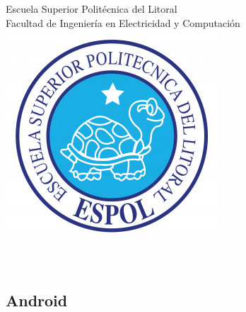 \documentclass[10pt]{article}
\begin{document}
{\centering
{\Large{Escuela Superior Polit\'ecnica del Litoral\\Facultad de Ingenier\'ia en Electricidad y Computaci\'on\\}}
\vspace{0.6in}
\includegraphics[scale=0.5]{espol.png}\\
\vspace{0.8in}
{\LARGE \textbf{}\\
\vspace{0.5in}

\newpage
\tableofcontents

\newpage
\begin{flushleft}
\section{Android}
\vspace{0.7in}
\begin{abstract}
\vspace{0.3in}
\large{Este es el primer trabajo de lenguajes de programaci\'on,para el cual las indicaciones fueron las de realizar un proyecto de aplicaci\'on m\'ovil, mas espec\'ifico en Android.\\
Hubieron algunas dificultades al principio, era algo nuevo para todos, a\'un no ten\'iamos clara la idea de lo que se har\'ia.\\
Entre algunas ideas, finalmente surgi\'o MY TWIN, algo que realmente nos pareci\'o novedoso y con alguna utilidad que se puede agregar a un dispositivo m\'ovil.\\
Se trabajo bastante con los recursos del tel\'efono y se hizo mucho \'enfasis en la proyecci\'on de tener un dispositivo con todo personalizado.}
\end{abstract}
\end{flushleft}

}}
\end{document}
